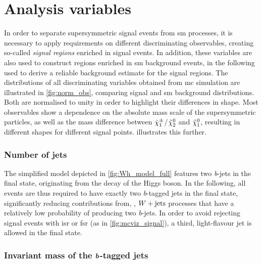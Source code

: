 \section{Analysis variables}\label{sec:variables}

In order to separate supersymmetric signal events from \gls{sm} processes, it is necessary to apply requirements on different discriminating observables, creating so-called \textit{signal regions} enriched in signal events. In addition, these variables are also used to construct regions enriched in \gls{sm} background events, in the following used to derive a reliable background estimate for the signal regions. The distributions of all discriminating variables obtained from \gls{mc} simulation are illustrated in \cref{fig:norm_obs}, comparing signal and \gls{sm} background distributions. Both are normalised to unity in order to highlight their differences in shape. Most observables show a dependence on the absolute mass scale of the supersymmetric particles, as well as the mass difference between $\tilde{\chi}_1^\pm$/$\tilde{\chi}_2^0$ and $\tilde{\chi}_1^0$, resulting in different shapes for different signal points.  illustrates this further.

\subsubsection{Number of jets}

The simplified model depicted in \cref{fig:Wh_model_full} features two \textit{b}-jets in the final state, originating from the decay of the Higgs boson. In the following, all events are thus required to have exactly two \textit{b}-tagged jets in the final state, significantly reducing contributions from, \eg, $W+\mathrm{jets}$ processes that have a relatively low probability of producing two \textit{b}-jets. In order to avoid rejecting signal events with \gls{isr} or \gls{fsr} (as \eg in \cref{fig:mcviz_signal}), a third, light-flavour jet is allowed in the final state.

\subsubsection[Invariant mass of the \textit{b}-tagged jets]{Invariant mass of the $\makemebold{b}$-tagged jets}

